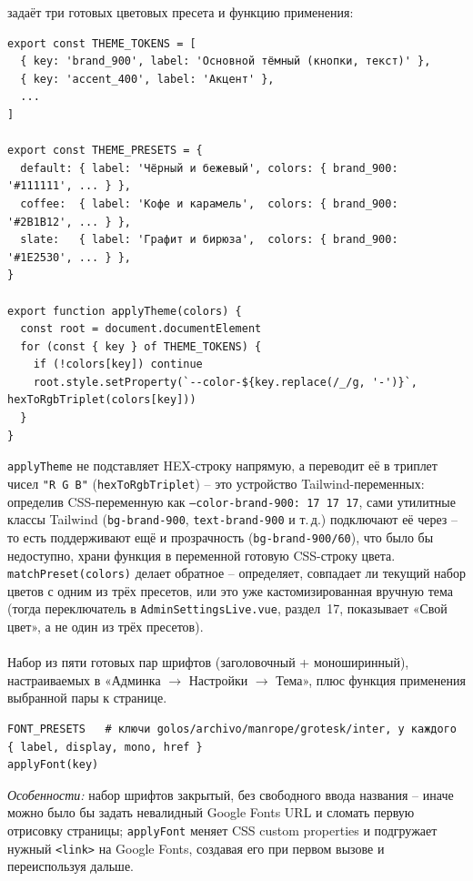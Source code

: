  задаёт три готовых цветовых
пресета и функцию применения:
\begin{verbatim}
export const THEME_TOKENS = [
  { key: 'brand_900', label: 'Основной тёмный (кнопки, текст)' },
  { key: 'accent_400', label: 'Акцент' },
  ...
]

export const THEME_PRESETS = {
  default: { label: 'Чёрный и бежевый', colors: { brand_900: '#111111', ... } },
  coffee:  { label: 'Кофе и карамель',  colors: { brand_900: '#2B1B12', ... } },
  slate:   { label: 'Графит и бирюза',  colors: { brand_900: '#1E2530', ... } },
}

export function applyTheme(colors) {
  const root = document.documentElement
  for (const { key } of THEME_TOKENS) {
    if (!colors[key]) continue
    root.style.setProperty(`--color-${key.replace(/_/g, '-')}`, hexToRgbTriplet(colors[key]))
  }
}
\end{verbatim}
\texttt{applyTheme} не подставляет HEX-строку напрямую, а переводит её в
триплет чисел \texttt{"R G B"} (\texttt{hexToRgbTriplet}) -- это
устройство Tailwind-переменных: определив CSS-переменную как
\texttt{--color-brand-900: 17 17 17}, сами утилитные классы Tailwind
(\texttt{bg-brand-900}, \texttt{text-brand-900} и т.\,д.) подключают её
через  -- то есть
поддерживают ещё и прозрачность (\texttt{bg-brand-900/60}), что было бы
недоступно, храни функция в переменной готовую CSS-строку цвета.
\texttt{matchPreset(colors)} делает обратное -- определяет, совпадает ли
текущий набор цветов с одним из трёх пресетов, или это уже
кастомизированная вручную тема (тогда переключатель в
\texttt{AdminSettingsLive.vue}, раздел~17, показывает «Свой цвет», а не
один из трёх пресетов).

\paragraph{}
Набор из пяти готовых пар шрифтов (заголовочный + моноширинный),
настраиваемых в «Админка $\to$ Настройки $\to$ Тема», плюс функция
применения выбранной пары к странице.
\begin{verbatim}
FONT_PRESETS   # ключи golos/archivo/manrope/grotesk/inter, у каждого { label, display, mono, href }
applyFont(key)
\end{verbatim}
\textit{Особенности:} набор шрифтов закрытый, без свободного ввода
названия -- иначе можно было бы задать невалидный Google Fonts URL и
сломать первую отрисовку страницы; \texttt{applyFont} меняет CSS custom
properties и подгружает нужный \texttt{<link>} на Google Fonts, создавая
его при первом вызове и переиспользуя дальше.

